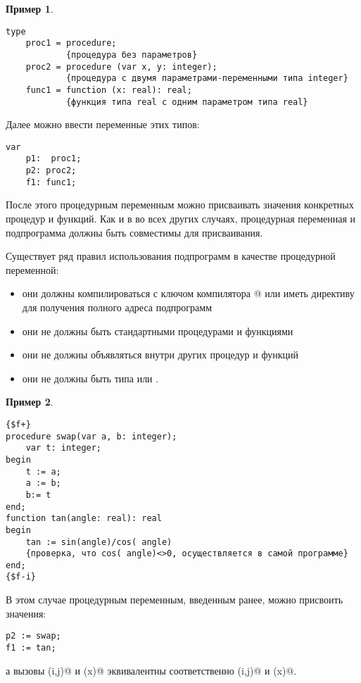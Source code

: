 \documentclass[12pt,a4paper]{article}
\theoremstyle{plain}
\theoremstyle{definition}
\newtheorem*{example}{Пример}
\theoremstyle{remark}
\begin{document}
\begin{example}
~\\
\begin{verbatim}
type
    proc1 = procedure;
            {процедура без параметров}
    proc2 = procedure (var x, y: integer);
            {процедура с двумя параметрами-переменными типа integer}
    func1 = function (x: real): real;
            {функция типа real с одним параметром типа real}
\end{verbatim}

Далее можно ввести переменные этих типов:

\begin{verbatim}
var
    p1:  proc1;
    p2: proc2;
    f1: func1;
\end{verbatim}
\end{example}

После этого процедурным переменным можно присваивать значения конкретных процедур и функций. Как и в во всех других случаях, процедурная переменная и подпрограмма должны быть совместимы для присваивания.

Существует ряд правил использования подпрограмм в качестве процедурной переменной:
\begin{itemize}
\item они должны компилироваться с ключом компилятора @ или иметь директиву \verb@far@ для получения полного адреса подпрограмм
\item они не должны быть стандартными процедурами и функциями
\item они не должны объявляться внутри других процедур и функций
\item они не должны быть типа \verb@inline@ или \verb@interrupt@.
\end{itemize}

\begin{example}
~\\
\begin{verbatim}
{$f+}
procedure swap(var a, b: integer);
    var t: integer;
begin
    t := a;
    a := b;
    b:= t
end;
function tan(angle: real): real
begin 
    tan := sin(angle)/cos( angle)
    {проверка, что cos( angle)<>0, осуществляется в самой программе}
end;
{$f-i}
\end{verbatim}

В этом случае процедурным переменным, введенным ранее, можно присвоить значения:
\begin{verbatim}
p2 := swap;
f1 := tan;
\end{verbatim}

а вызовы (i,j)@ и (x)@ эквивалентны соответственно \verb@swap(i,j)@ и \verb@tan(x)@.
\end{example}
\end{document}

